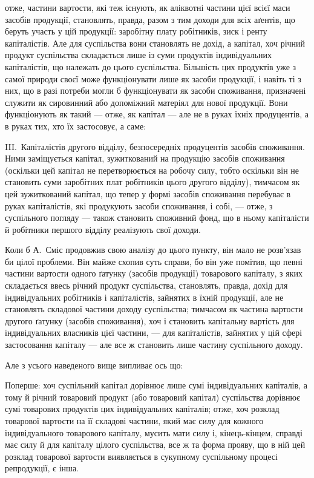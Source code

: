 \parcont{}  %
отже, частини вартости, які теж існують, як аліквотні частини цієї всієї
маси засобів продукції, становлять, правда, разом з тим доходи для
всіх аґентів, що беруть участь у цій продукції: заробітну
плату робітників, зиск і ренту капіталістів. Але для суспільства
вони становлять не дохід, а капітал, хоч річний продукт суспільства
складається лише із суми продуктів індивідуальних капіталістів, що належать
до цього суспільства. Більшість цих продуктів уже з самої природи
своєї може функціонувати лише як засоби продукції, і навіть ті з них,
що в разі потреби могли б функціонувати як засоби споживання, призначені
служити як сировинний або допоміжний матеріял для нової продукції.
Вони функціонують як такий — отже, як капітал — але не в руках
їхніх продуцентів, а в руках тих, хто їх застосовує, а саме:

III.~Капіталістів другого відділу, безпосередніх продуцентів засобів
споживання. Ними заміщується капітал, зужиткований на продукцію
засобів споживання (оскільки цей капітал не перетворюється на робочу
силу, тобто оскільки він не становить суми заробітних плат робітників
цього другого відділу), тимчасом як цей зужиткований капітал, що тепер
у формі засобів споживання перебуває в руках капіталістів, які продукують
засоби споживання, і собі, — отже, з суспільного погляду — також
становить споживний фонд, що в ньому капіталісти
й робітники першого відділу реалізують свої доходи.

Коли б А.~Сміс продовжив свою аналізу до цього пункту, він мало
не розв’язав би цілої проблеми. Він майже схопив суть справи, бо він
уже помітив, що певні частини вартости одного ґатунку (засобів продукції)
товарового капіталу, з яких складається ввесь річний продукт
суспільства, становлять, правда, дохід для індивідуальних робітників і капіталістів,
зайнятих в їхній продукції, але не становлять складової частини
доходу суспільства; тимчасом як частина вартости другого ґатунку
(засобів споживання), хоч і становить капітальну вартість для індивідуальних
власників цієї частини, — для капіталістів, зайнятих у цій сфері
застосовання капіталу — але все ж становить лише частину суспільного
доходу.

Але з усього наведеного вище випливає ось що:

Поперше: хоч суспільний капітал дорівнює лише сумі індивідуальних
капіталів, а тому й річний товаровий продукт (або товаровий капітал)
суспільства дорівнює сумі товарових продуктів цих індивідуальних капіталів;
отже, хоч розклад товарової вартости на її складові частини, який має
силу для кожного індивідуального товарового капіталу, мусить мати силу
і, кінець-кінцем, справді має силу й для капіталу цілого суспільства, все ж
та форма прояву, що в ній цей розклад товарової вартости виявляється
в сукупному суспільному процесі репродукції, є інша.

